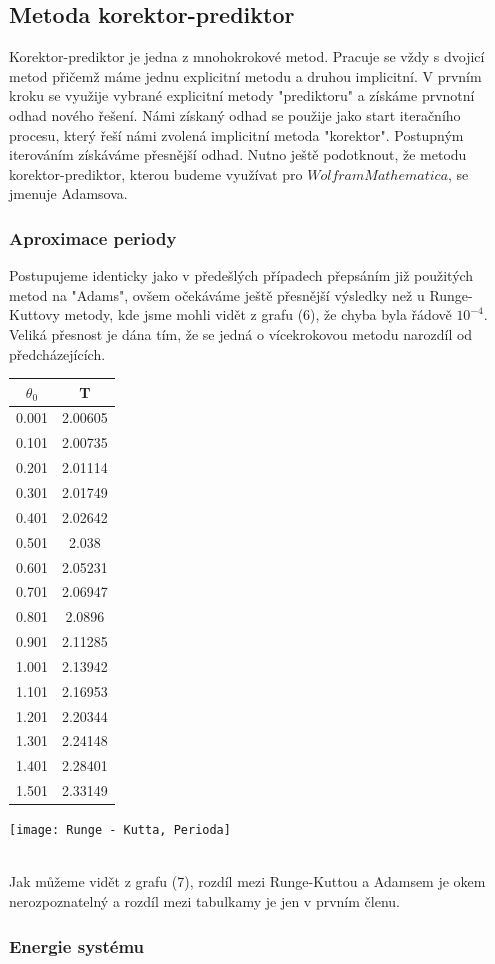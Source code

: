 \documentclass[reqno, a4paper]{amsart}
\begin{document}
			\subsection{Metoda korektor-prediktor}
			\label{sec:Metoda korektor-prediktor}
			Korektor-prediktor je jedna z mnohokrokové metod. Pracuje se vždy s dvojicí metod přičemž máme jednu explicitní metodu a druhou implicitní. V prvním kroku se využije vybrané explicitní metody "prediktoru" a získáme prvnotní odhad nového řešení. Námi získaný odhad se použije jako start iteračního procesu, který řeší námi zvolená implicitní metoda "korektor". Postupným iterováním získáváme přesnější odhad. Nutno ještě podotknout, že metodu korektor-prediktor, kterou budeme využívat pro $ Wolfram Mathematica $, se jmenuje Adamsova.
			\subsubsection{Aproximace periody}
			Postupujeme identicky jako v předešlých případech přepsáním již použitých metod na "Adams", ovšem očekáváme ještě přesnější výsledky než u Runge-Kuttovy metody, kde jsme mohli vidět z grafu (6), že chyba byla řádově $10^{-4}$. Veliká přesnost je dána tím, že se jedná o vícekrokovou metodu narozdíl od předcházejících.
			\\
			\begin{minipage}{\textwidth}
				\begin{minipage}[b]{0.25\textwidth}
					\centering
					\begin{tabular}{|c|c|}
						\hline
						$\theta_{0}$ & T \\ 
						\hline
						0.001& 2.00605\\0.101& 2.00735\\0.201& 2.01114\\0.301& 2.01749\\0.401& 2.02642\\0.501& 2.038\\0.601& 2.05231\\0.701& 2.06947\\0.801& 2.0896\\0.901& 2.11285\\1.001& 2.13942
						\\1.101& 2.16953\\1.201& 2.20344\\1.301& 2.24148\\1.401& 2.28401\\1.501& 2.33149\\
						\hline
					\end{tabular}
				\end{minipage}
			\begin{minipage}[b]{0.79\textwidth}
				\centering
				\texttt{[image: Runge - Kutta, Perioda]}
			\end{minipage}
			\hfill
		\end{minipage}
	\\
	Jak můžeme vidět z grafu (7), rozdíl mezi Runge-Kuttou a Adamsem je okem nerozpoznatelný a rozdíl mezi tabulkamy je jen v prvním členu.
	\subsubsection{Energie systému}
	
	
	
			
\end{document}

